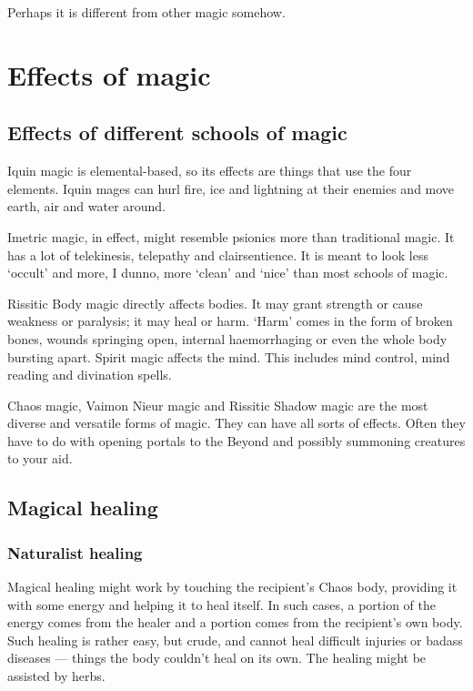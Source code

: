 Perhaps it is different from other magic somehow. 






\section{Effects of magic}
\subsection{Effects of different schools of magic}
Iquin magic is elemental-based, so its effects are things that use the four elements. Iquin mages can hurl fire, ice and lightning at their enemies and move earth, air and water around. 

Imetric magic, in effect, might resemble psionics more than traditional magic. It has a lot of telekinesis, telepathy and clairsentience. It is meant to look less `occult' and more, I dunno, more `clean' and `nice' than most schools of magic. 

Rissitic Body magic directly affects bodies. It may grant strength or cause weakness or paralysis; it may heal or harm. `Harm' comes in the form of broken bones, wounds springing open, internal haemorrhaging or even the whole body bursting apart. Spirit magic affects the mind. This includes mind control, mind reading and divination spells. 

Chaos magic, Vaimon Nieur magic and Rissitic Shadow magic are the most diverse and versatile forms of magic. They can have all sorts of effects. Often they have to do with opening portals to the Beyond and possibly summoning creatures to your aid. 



\subsection{Magical healing}
\subsubsection{Naturalist healing}
Magical healing might work by touching the recipient's Chaos body, providing it with some energy and helping it to heal itself. In such cases, a portion of the energy comes from the healer and a portion comes from the recipient's own body. Such healing is rather easy, but crude, and cannot heal difficult injuries or badass diseases --- things the body couldn't heal on its own. The healing might be assisted by herbs.

